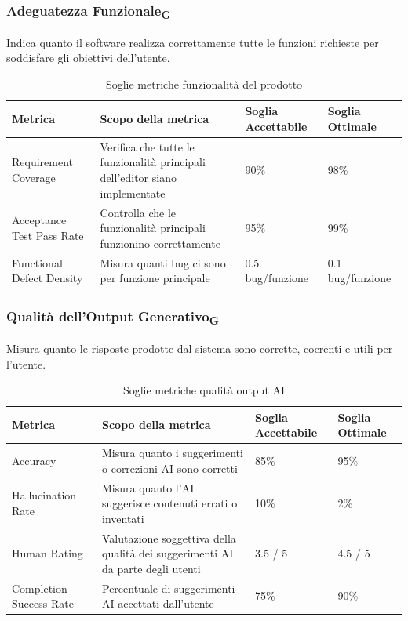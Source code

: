 \documentclass[11pt,a4paper]{article}
\begin{document}
\subsubsection{Adeguatezza Funzionale\textsubscript{G}}
Indica quanto il software realizza correttamente tutte le funzioni richieste per soddisfare gli obiettivi dell’utente.
\begin{table}[H]
\centering
\renewcommand{\arraystretch}{1.5}
\begin{tabular}{|M{0.25\textwidth}|M{0.35\textwidth}|M{0.15\textwidth}|M{0.15\textwidth}|}
\hline
\textbf{Metrica} & \textbf{Scopo della metrica} & \textbf{Soglia Accettabile} & \textbf{Soglia Ottimale} \\
\hline
Requirement Coverage & Verifica che tutte le funzionalità principali dell’editor siano implementate & 90\% & 98\% \\ \hline
Acceptance Test Pass Rate & Controlla che le funzionalità principali funzionino correttamente & 95\% & 99\% \\ \hline
Functional Defect Density & Misura quanti bug ci sono per funzione principale & 0.5 bug/funzione & 0.1 bug/funzione \\
\hline
\end{tabular}
\caption{Soglie metriche funzionalità del prodotto}
\end{table}

\subsubsection{Qualità dell'Output Generativo\textsubscript{G}}
Misura quanto le risposte prodotte dal sistema sono corrette, coerenti e utili per l’utente.
\begin{table}[H]
\centering
\renewcommand{\arraystretch}{1.5}
\begin{tabular}{|M{0.25\textwidth}|M{0.35\textwidth}|M{0.15\textwidth}|M{0.15\textwidth}|}
\hline
\textbf{Metrica} & \textbf{Scopo della metrica} & \textbf{Soglia Accettabile} & \textbf{Soglia Ottimale} \\
\hline
Accuracy & Misura quanto i suggerimenti o correzioni AI sono corretti & 85\% & 95\% \\ \hline
Hallucination Rate & Misura quanto l’AI suggerisce contenuti errati o inventati & 10\% & 2\% \\ \hline
Human Rating & Valutazione soggettiva della qualità dei suggerimenti AI da parte degli utenti & 3.5 / 5 & 4.5 / 5 \\ \hline
Completion Success Rate & Percentuale di suggerimenti AI accettati dall’utente & 75\% & 90\% \\
\hline
\end{tabular}
\caption{Soglie metriche qualità output AI}
\end{table}
\end{document}
